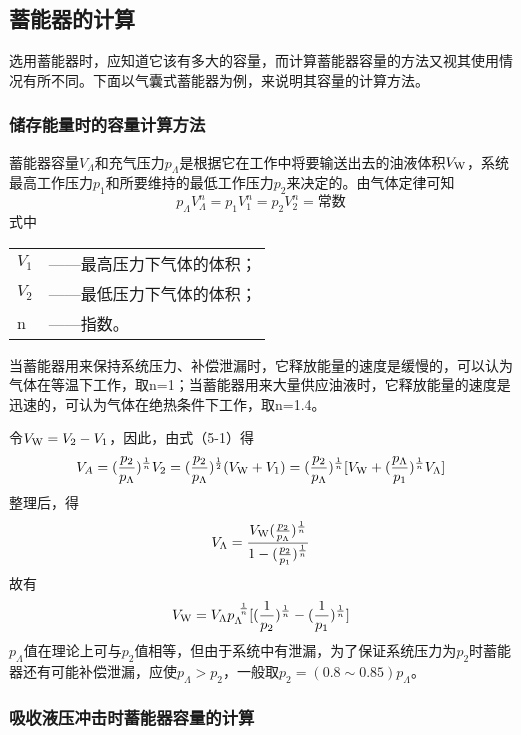 \subsection{蓄能器的计算}

选用蓄能器时，应知道它该有多大的容量，而计算蓄能器容量的方法又视其使用情况有所不同。下面以气囊式蓄能器为例，来说明其容量的计算方法。

\subsubsection{储存能量时的容量计算方法}

蓄能器容量$V_{\Lambda}$和充气压力$p_{\Lambda}$是根据它在工作中将要输送出去的油液体积$V_{\mbox{\scriptsize W}}$，系统最高工作压力$p_{1}$和所要维持的最低工作压力$p_{2}$来决定的。由气体定律可知
\begin{equation}
p_{\Lambda}V^{n}_{\Lambda}=p_{1}V^{n}_{1}=p_{2}V^{n}_{2}=\mbox{常数}
\end{equation}
式中
\begin{tabular}[t]{ll}
$V_{1}$&——最高压力下气体的体积；\\
$V_{2}$&——最低压力下气体的体积；\\
n&——指数。
\end{tabular}

当蓄能器用来保持系统压力、补偿泄漏时，它释放能量的速度是缓慢的，可以认为气体在等温下工作，取n=1；当蓄能器用来大量供应油液时，它释放能量的速度是迅速的，可认为气体在绝热条件下工作，取n=1.4。

令$V_{\mbox{\scriptsize W}}=V_{2}-V_{1}$，因此，由式（5-1）得
$$V_{A}=(\frac{p_{2}}{p_{\Lambda}})^{\frac{1}{n}}V_{2}=(\frac{p_{2}}{p_{\Lambda}})^{\frac{1}{2}}(V_{\mbox{\scriptsize W}}+V_{1})=(\frac{p_{2}}{p_{\Lambda}})^{\frac{1}{n}}[V_{\mbox{\scriptsize W}}+(\frac{p_{\Lambda}}{p_{1}})^{\frac{1}{n}}V_{\Lambda}]
$$
整理后，得
$$
V_{\Lambda}=\frac{V_{\mbox{\scriptsize W}}(\frac{p_{2}}{p_{\Lambda}})^{\frac{1}{n}}}{1-(\frac{p_{2}}{p_{1}})^{\frac{1}{n}}}
$$
故有
\begin{equation}
V_{\mbox{\scriptsize W}}=V_{\Lambda}p_{\Lambda}^{\ \frac{1}{n}}[(\frac{1}{p_{2}})^{\frac{1}{n}}-(\frac{1}{p_{1}})^{\frac{1}{n}}]
\end{equation}
$p_{\Lambda}$值在理论上可与$p_{2}$值相等，但由于系统中有泄漏，为了保证系统压力为$p_{2}$时蓄能器还有可能补偿泄漏，应使$p_{\Lambda}>p_{2}$，一般取$p_{2}=(0.8\sim0.85)p_{\Lambda}$。

\subsubsection{吸收液压冲击时蓄能器容量的计算}

